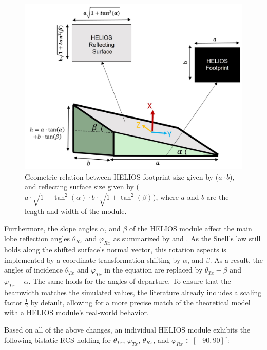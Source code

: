 \begin{figure}[tb]
	\centering
	\includegraphics[width=0.5\linewidth]{images/Section 3 Images/HELIOS_footprint}
	\caption{Geometric relation between HELIOS footprint size given by ($a \cdot b$), and reflecting surface size given by ($a \cdot \sqrt{1+\tan^2(\alpha)} \cdot b \cdot \sqrt{1+\tan^2(\beta)}$), where $a$ and $b$ are the length and width of the module.}
	\label{fig:HELIOS_footprint}
\end{figure}
Furthermore, the slope angles $\alpha$, and $\beta$ of the HELIOS module affect the main lobe reflection angles $\theta_{Rx}$ and $\varphi_{Rx}$ as summarized by  and . As the Snell's law still holds along the shifted surface's normal vector, this rotation aspects is implemented by a coordinate transformation shifting by $\alpha$, and $\beta$. As a result, the angles of incidence $\theta_{Tx}$ and $\varphi_{Tx}$ in the equation are replaced by $\theta_{Tx}-\beta$ and $\varphi_{Tx}-\alpha$. The same holds for the angles of departure. To ensure that the beamwidth matches the simulated values, the literature already includes a scaling factor $\frac{1}{2}$ by default, allowing for a more precise match of the theoretical model with a HELIOS module's real-world behavior.

Based on all of the above changes, an individual HELIOS module exhibits the following bistatic RCS holding for $\theta_{Tx}$, $\varphi_{Tx}$, $\theta_{Rx}$, and $\varphi_{Rx} \in [-90, 90]^\circ$:

